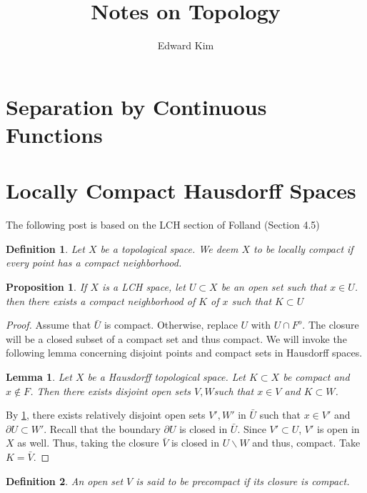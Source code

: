 \documentclass[12pt]{article}
\title{Notes on Topology}
\author{Edward Kim}
\newtheorem{lemma}[theorem]{Lemma}
\newtheorem{definition}{Definition}[section]
\newtheorem{proposition}{Proposition}[section]
\begin{document}
\maketitle
\hrulefill

\section{Separation by Continuous Functions}




\section{Locally Compact Hausdorff Spaces}

The following post is based on the LCH section of Folland (Section 4.5)

\begin{definition}
 Let $X$ be a topological space. We deem $X$ to be locally compact if every point has a compact neighborhood.
\end{definition}

\begin{proposition} \label{prop1}
 If $X$ is a LCH space, let $U \subset X$ be an open set such that $x \in U$. then there exists a compact neighborhood of $K$ of $x$ such that $K \subset U$
\end{proposition}

\begin{proof}
Assume that $\bar{U}$ is compact. Otherwise, replace $U$ with $U \cap F^o$. The closure will be a closed subset of a compact set and thus compact. We will invoke the following lemma concerning disjoint points and compact sets in Hausdorff spaces.
  \begin{lemma} \label{lem1}
    Let $X$ be a Hausdorff topological space. Let $K \subset X$ be compact and $x \not\in F$. Then there exists disjoint open sets $V,W$such that $x \in V$ and $K 
    \subset W$.
  \end{lemma}
  
  By \ref{lem1}, there exists relatively disjoint open sets $V',W'$ in $\bar{U}$ such that $x \in V'$ and $\partial {U} \subset W'$. Recall that the boundary $\partial U$ is closed in $\bar{U}$. Since $V' \subset U$, $V'$ is open in $X$
  as well. Thus, taking the closure $\bar{V}$ is closed in $U \backslash W$ and thus, compact. Take $K = \bar{V}$.
\end{proof}

\begin{definition}
 An open set $V$ is said to be precompact if its closure is compact.
\end{definition}
\end{document}
